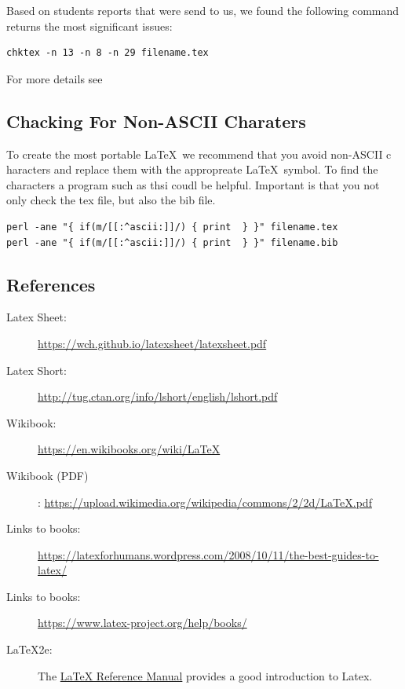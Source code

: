 Based on students reports that were send to us, we found the following
command returns the most significant issues:

\begin{lstlisting}
chktex -n 13 -n 8 -n 29 filename.tex
\end{lstlisting}

For more details see


\subsection{Chacking For Non-ASCII Charaters}

To create the most portable \LaTeX~we recommend that you avoid
non-ASCII c haracters and replace them with the appropreate
\LaTeX~symbol. To find the characters a program such as thsi coudl be
helpful. Important is that you not only check the tex file, but also
the bib file.

\begin{lstlisting}
perl -ane "{ if(m/[[:^ascii:]]/) { print  } }" filename.tex
perl -ane "{ if(m/[[:^ascii:]]/) { print  } }" filename.bib
\end{lstlisting}

\subsection{References}

\begin{description}


\item[Latex Sheet:]    \url{https://wch.github.io/latexsheet/latexsheet.pdf}

\item[Latex Short:]    \url{http://tug.ctan.org/info/lshort/english/lshort.pdf}

\item[Wikibook:]       \url{https://en.wikibooks.org/wiki/LaTeX}
\item[Wikibook (PDF)]: \url{https://upload.wikimedia.org/wikipedia/commons/2/2d/LaTeX.pdf}

\item [Links to books:] \url{https://latexforhumans.wordpress.com/2008/10/11/the-best-guides-to-latex/}
\item [Links to books:] \url{https://www.latex-project.org/help/books/}
\item [LaTeX2e:]
  The
  \href{http://texdoc.net/texmf-dist/doc/latex/latex2e-help-texinfo/latex2e.pdf}{LaTeX
  Reference Manual} provides a good introduction to Latex.

\end{description}


